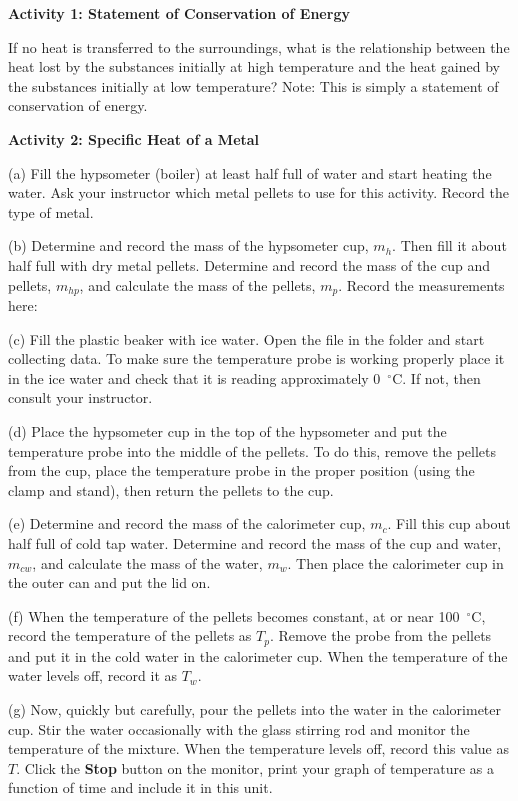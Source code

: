 \textbf{Activity 1: Statement of Conservation of Energy}

If no heat is transferred to the surroundings, what is the relationship
between the heat lost by the substances initially at high temperature
and the heat gained by the substances initially at low temperature?
Note: This is simply a statement of conservation of energy.
\answerspace{15mm}

\pagebreak[3]
\textbf{Activity 2: Specific Heat of a Metal}

(a) Fill the hypsometer (boiler) at least half full of water and start
heating the water. Ask your instructor which metal pellets to use for this 
activity.
Record the type of metal.
\answerspace{10mm}

(b) Determine and record the mass of the hypsometer cup, $m_h$.
Then fill it about half full with dry metal pellets. Determine
and record the mass of the cup and pellets, $m_{hp}$, and calculate
the mass of the pellets, $m_p$. Record the measurements here:
\answerspace{10mm}

(c) Fill the plastic beaker with ice water. Open the file 
in the \filename{\coursefolder} folder and start
collecting data. To make sure the temperature probe is working 
properly place it in the ice water and
check that it is reading approximately 0~$^{\circ }$C. If not,
then consult your instructor.

(d) Place the hypsometer cup in the top of the hypsometer and put the temperature probe into the middle of the pellets.  To do this, remove the pellets from the cup, place the temperature probe in the proper position (using the clamp and stand), then return the pellets to the cup.

(e) Determine and record the mass of the calorimeter cup, $m_c$.
Fill this cup about half full of cold tap water. Determine and record
the mass of the cup and water, $m_{cw}$, and calculate the mass
of the water, $m_w$. Then place the calorimeter cup in the outer
can and put the lid on.
\vspace{15mm}

(f) When the temperature of the pellets becomes constant, at or near
100~$^{\circ }$C, record the temperature of the pellets as $T_{p}$.
Remove the probe from the pellets and put it in the cold water in the calorimeter cup. When the temperature of the water levels off, record it as $T_{w}$.
\vspace{15mm}

(g) Now, quickly but carefully, pour the pellets into the water in
the calorimeter cup. Stir the water occasionally with the glass stirring rod and
monitor the temperature of the mixture. When the temperature levels off, record
this value as $T$. Click the {\bf Stop} button on the monitor, print your graph of temperature as a function of time and include it in this unit.

